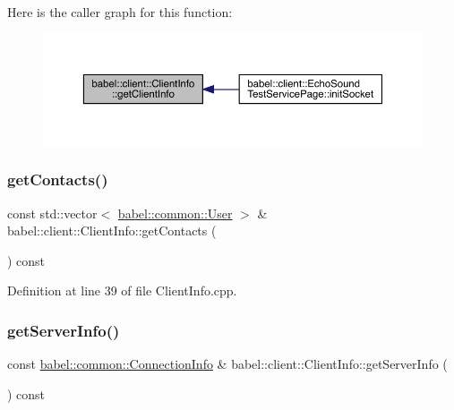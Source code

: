 Here is the caller graph for this function\+:\nopagebreak
\begin{figure}[H]
\begin{center}
\leavevmode
\includegraphics[width=350pt]{classbabel_1_1client_1_1_client_info_a50cd2a1bae911402337b166c55d28770_icgraph}
\end{center}
\end{figure}
\mbox{\label{classbabel_1_1client_1_1_client_info_ab1907aee14edda4e7e4dab169c6f0262}} 
\subsubsection{\texorpdfstring{get\+Contacts()}{getContacts()}}
{\footnotesize\ttfamily const std\+::vector$<$ \mbox{\hyperlink{classbabel_1_1common_1_1_user}{babel\+::common\+::\+User}} $>$ \& babel\+::client\+::\+Client\+Info\+::get\+Contacts (\begin{DoxyParamCaption}{ }\end{DoxyParamCaption}) const}



Definition at line 39 of file Client\+Info.\+cpp.

\mbox{\label{classbabel_1_1client_1_1_client_info_a800b3a6c7bb9fbd52b2400f0f5fa355e}} 
\subsubsection{\texorpdfstring{get\+Server\+Info()}{getServerInfo()}}
{\footnotesize\ttfamily const \mbox{\hyperlink{classbabel_1_1common_1_1_connection_info}{babel\+::common\+::\+Connection\+Info}} \& babel\+::client\+::\+Client\+Info\+::get\+Server\+Info (\begin{DoxyParamCaption}{ }\end{DoxyParamCaption}) const}



